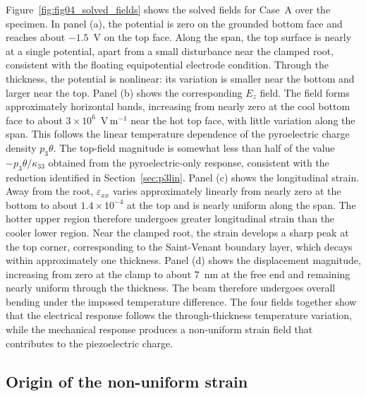 \documentclass[a4paper, 11pt, twoside]{article}
\begin{document}
Figure~\ref{fig:fig04_solved_fields} shows the solved fields for Case~A over the
specimen. In panel (a), the potential is zero on the grounded bottom face and reaches
about $-1.5$~V on the top face. Along the span, the top surface is nearly at a single
potential, apart from a small disturbance near the clamped root, consistent with the
floating equipotential electrode condition. Through the thickness, the potential is
nonlinear: its variation is smaller near the bottom and larger near the top. Panel
(b) shows the corresponding $E_z$ field. The field forms approximately horizontal
bands, increasing from nearly zero at the cool bottom face to about
$3\times10^{6}$~V\,m$^{-1}$ near the hot top face, with little variation along the
span. This follows the linear temperature dependence of the pyroelectric charge
density $p_3\theta$. The top-field magnitude is somewhat less than half of the value
$-p_3\theta/\kappa_{33}$ obtained from the pyroelectric-only response, consistent with
the reduction identified in Section~\ref{sec:p3lin}. Panel (c) shows the longitudinal
strain. Away from the root, $\varepsilon_{xx}$ varies approximately linearly from
nearly zero at the bottom to about $1.4\times10^{-4}$ at the top and is nearly uniform
along the span. The hotter upper region therefore undergoes greater longitudinal
strain than the cooler lower region. Near the clamped root, the strain develops a
sharp peak at the top corner, corresponding to the Saint-Venant boundary layer, which
decays within approximately one thickness. Panel (d) shows the displacement
magnitude, increasing from zero at the clamp to about 7~nm at the free end and
remaining nearly uniform through the thickness. The beam therefore undergoes overall
bending under the imposed temperature difference. The four fields together show that
the electrical response follows the through-thickness temperature variation, while
the mechanical response produces a non-uniform strain field that contributes to the
piezoelectric charge.

\subsection{Origin of the non-uniform strain}
\label{sec:clamp}
\end{document}
